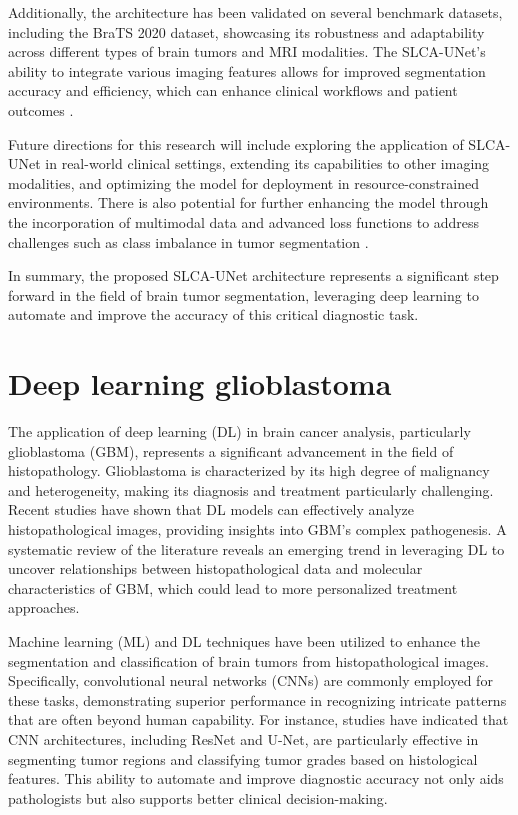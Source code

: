 \documentclass[runningheads]{llncs}
\begin{document}
Additionally, the architecture has been validated on several benchmark datasets, including the BraTS 2020 dataset, showcasing its robustness and adaptability across different types of brain tumors and MRI modalities. The SLCA-UNet's ability to integrate various imaging features allows for improved segmentation accuracy and efficiency, which can enhance clinical workflows and patient outcomes 	\cite{P.S._2025}.

Future directions for this research will include exploring the application of SLCA-UNet in real-world clinical settings, extending its capabilities to other imaging modalities, and optimizing the model for deployment in resource-constrained environments. There is also potential for further enhancing the model through the incorporation of multimodal data and advanced loss functions to address challenges such as class imbalance in tumor segmentation 	\cite{P.S._2025}.

In summary, the proposed SLCA-UNet architecture represents a significant step forward in the field of brain tumor segmentation, leveraging deep learning to automate and improve the accuracy of this critical diagnostic task.
\section{Deep learning glioblastoma}
The application of deep learning (DL) in brain cancer analysis, particularly glioblastoma (GBM), represents a significant advancement in the field of histopathology. Glioblastoma is characterized by its high degree of malignancy and heterogeneity, making its diagnosis and treatment particularly challenging. Recent studies have shown that DL models can effectively analyze histopathological images, providing insights into GBM's complex pathogenesis. A systematic review of the literature reveals an emerging trend in leveraging DL to uncover relationships between histopathological data and molecular characteristics of GBM, which could lead to more personalized treatment approaches.

Machine learning (ML) and DL techniques have been utilized to enhance the segmentation and classification of brain tumors from histopathological images. Specifically, convolutional neural networks (CNNs) are commonly employed for these tasks, demonstrating superior performance in recognizing intricate patterns that are often beyond human capability. For instance, studies have indicated that CNN architectures, including ResNet and U-Net, are particularly effective in segmenting tumor regions and classifying tumor grades based on histological features. This ability to automate and improve diagnostic accuracy not only aids pathologists but also supports better clinical decision-making.
\end{document}
